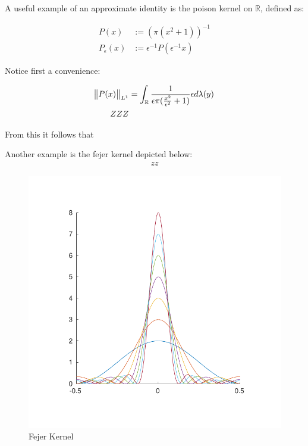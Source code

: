 \begin{example}

A useful example of an approximate identity is the poison kernel on $\mathbb{R}$, defined as:

\begin{align*}
P(x) &:= (\pi(x^2+1))^{-1} \\
P_\epsilon(x) &:= \epsilon^{-1}P(\epsilon^{-1}x)
\end{align*}

Notice first a convenience:

\begin{align*}
\norm{P(x)}_{L^1} &= \int_\mathbb{R} \frac{1}{\epsilon \pi (\frac{x^2}{\epsilon^2}+1)} \epsilon d\lambda(y) \\
ZZZ
\end{align*}

From this it follows that 

\end{example}

\begin{example}
Another example is the fejer kernel depicted below:
\begin{align*}
zz
\end{align*}

\begin{figure}[h!bt]
\centering
\includegraphics[width = \textwidth]{matlab/fejerkernel}
\caption{Fejer Kernel}
\label{fejer}
\end{figure}
\end{example}

